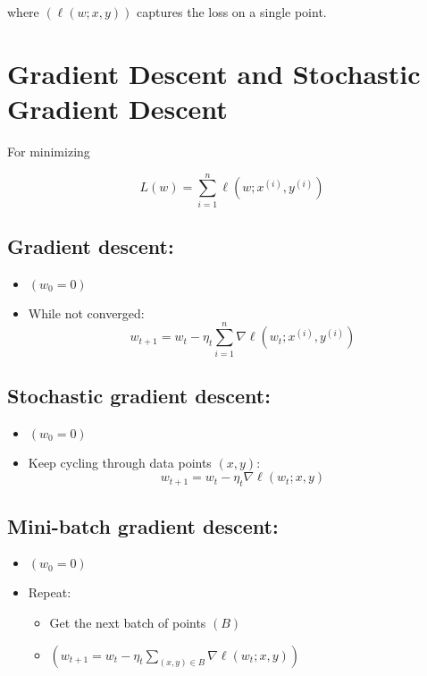 \documentclass{article}
\begin{document}
where $( \ell(w ; x, y) )$ captures the loss on a single point.

\section*{Gradient Descent and Stochastic Gradient Descent}
For minimizing

\begin{equation}
L(w) = \sum_{i=1}^{n} \ell\left(w ; x^{(i)}, y^{(i)}\right)
\end{equation}

\subsection*{Gradient descent:}
\begin{itemize}
    \item $( w_{0} = 0 )$
    \item While not converged:
    \begin{equation}
    w_{t+1} = w_{t} - \eta_{t} \sum_{i=1}^{n} \nabla \ell\left(w_{t} ; x^{(i)}, y^{(i)}\right)
    \end{equation}
\end{itemize}

\subsection*{Stochastic gradient descent:}
\begin{itemize}
    \item $( w_{0} = 0 )$
    \item Keep cycling through data points $( x, y )$:
    \begin{equation}
    w_{t+1} = w_{t} - \eta_{t} \nabla \ell\left(w_{t} ; x, y\right)
    \end{equation}
\end{itemize}

\subsection*{Mini-batch gradient descent:}
\begin{itemize}
    \item $( w_{0} = 0 )$
    \item Repeat:
    \begin{itemize}
        \item Get the next batch of points $( B )$
        \item $( w_{t+1} = w_{t} - \eta_{t} \sum_{(x, y) \in B} \nabla \ell\left(w_{t} ; x, y\right) )$
    \end{itemize}
\end{itemize}
\end{document}
